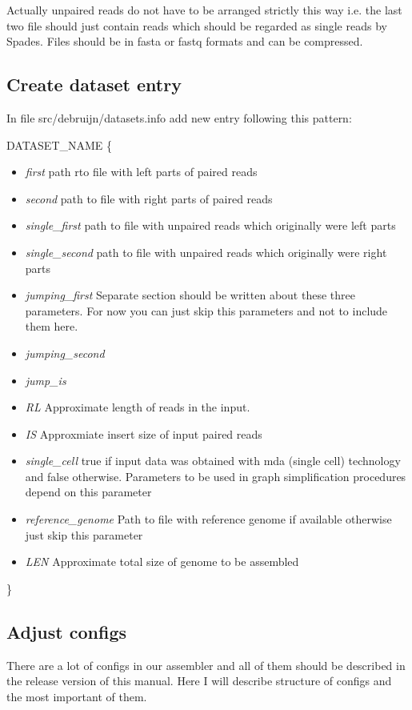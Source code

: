\documentclass[a4paper,10pt]{article}
\begin{document}
Actually unpaired reads do not have to be arranged strictly this way i.e. the last two file should just contain reads which should be regarded as single reads by Spades.
Files should be in fasta or fastq formats and can be compressed.

\subsection{Create dataset entry}
In file src/debruijn/datasets.info add new entry following this pattern:

DATASET\_NAME
\{
\begin{itemize}
\item {\it first} path rto file with left parts of paired reads
\item{\it second} path to file with right parts of paired reads
\item{\it single\_first} path to file with unpaired reads which originally were left parts
\item{\it single\_second} path to file with unpaired reads which originally were right parts
\item{\it jumping\_first} Separate section should be written about these three parameters. For now you can just skip this parameters and not to include them here.
\item{\it jumping\_second}
\item{\it jump\_is} 
\item{\it RL} Approximate length of reads in the input.
\item{\it IS} Approxmiate insert size of input paired reads
\item{\it single\_cell} true if input data was obtained with mda (single cell) technology and false otherwise. Parameters to be used in graph simplification procedures depend on this parameter
\item{\it reference\_genome} Path to file with reference genome if available otherwise just skip this parameter
\item{\it LEN} Approximate total size of genome to be assembled
\end{itemize}
\}

\subsection{Adjust configs}
There are a lot of configs in our assembler and all of them should be described in the release version of this manual. Here I will describe structure of configs and the most important of them.
\end{document}
